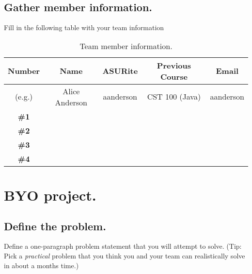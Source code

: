 \documentclass[11pt]{article}
\begin{document}
\subsection{Gather member information.}
Fill in the following table with your team information
\begin{table}[htdp]
\caption{Team member information.}
\begin{center}
\begin{tabular}{c c c c c}
\hline\hline
Number & Name & ASURite & Previous Course & Email \\ [.5ex]
\hline
(e.g.) & Alice Anderson & aanderson & CST 100 (Java) & aanderson \\
\hline
{\bf \#1} & & & & \\ [1ex]
{\bf \#2} & & & & \\ [1ex]
{\bf \#3} & & & & \\ [1ex]
{\bf \#4} & & & & \\ [1ex]
\hline
\end{tabular}
\end{center}
\label{table:team}
\end{table}

\pagebreak

\section{BYO project.}

\subsection{Define the problem.}

Define a one-paragraph problem statement that you will attempt to solve. (Tip: Pick a {\it practical} problem that you think you and your team can realistically solve in about a months time.)


\underline{\phantom{\hspace{5in}}}

\underline{\phantom{\hspace{5in}}}

\underline{\phantom{\hspace{5in}}}

\underline{\phantom{\hspace{5in}}}

\underline{\phantom{\hspace{5in}}}

\underline{\phantom{\hspace{5in}}}
\end{document}
